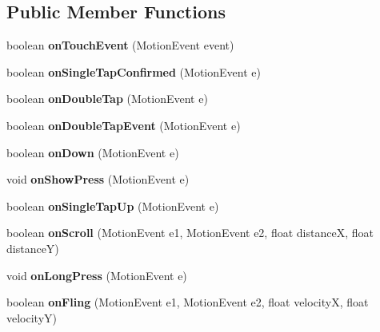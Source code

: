 \subsection*{Public Member Functions}
\begin{DoxyCompactItemize}
\item 
boolean {\bfseries on\+Touch\+Event} (Motion\+Event event)\label{classcom_1_1roninsamakun_1_1csbraintraining_1_1_main_activity_abf097d2c08991417da2833379a97d33a}

\item 
boolean {\bfseries on\+Single\+Tap\+Confirmed} (Motion\+Event e)\label{classcom_1_1roninsamakun_1_1csbraintraining_1_1_main_activity_a750832257fcb63d6c4e245071ff719a7}

\item 
boolean {\bfseries on\+Double\+Tap} (Motion\+Event e)\label{classcom_1_1roninsamakun_1_1csbraintraining_1_1_main_activity_a07bebe71a6ff31b21aa9a3b3b7f8144a}

\item 
boolean {\bfseries on\+Double\+Tap\+Event} (Motion\+Event e)\label{classcom_1_1roninsamakun_1_1csbraintraining_1_1_main_activity_a204b3e6043a647c12fa0f0b122cff57b}

\item 
boolean {\bfseries on\+Down} (Motion\+Event e)\label{classcom_1_1roninsamakun_1_1csbraintraining_1_1_main_activity_a978f78db9ede6cf24978532e2972b4cd}

\item 
void {\bfseries on\+Show\+Press} (Motion\+Event e)\label{classcom_1_1roninsamakun_1_1csbraintraining_1_1_main_activity_a7eeff385b05bb6b3dafaf9216fee7eb4}

\item 
boolean {\bfseries on\+Single\+Tap\+Up} (Motion\+Event e)\label{classcom_1_1roninsamakun_1_1csbraintraining_1_1_main_activity_a315cedaf4c5043ee46ed6495e5815c6d}

\item 
boolean {\bfseries on\+Scroll} (Motion\+Event e1, Motion\+Event e2, float distance\+X, float distance\+Y)\label{classcom_1_1roninsamakun_1_1csbraintraining_1_1_main_activity_a0ea594b35a9682ebb4916f3118b23a6d}

\item 
void {\bfseries on\+Long\+Press} (Motion\+Event e)\label{classcom_1_1roninsamakun_1_1csbraintraining_1_1_main_activity_a597b563e7ba9168a2db98b3a94fbb446}

\item 
boolean {\bfseries on\+Fling} (Motion\+Event e1, Motion\+Event e2, float velocity\+X, float velocity\+Y)\label{classcom_1_1roninsamakun_1_1csbraintraining_1_1_main_activity_a11d9d371d3efed268fa8bf7d7e40382d}


\end{DoxyCompactItemize}

